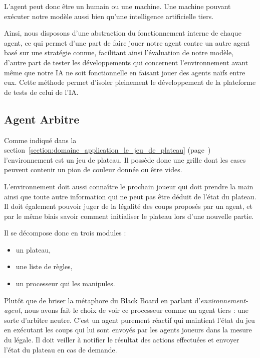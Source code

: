 L'agent peut donc être un humain ou une machine. Une machine pouvant exécuter notre modèle aussi bien qu'une intelligence artificielle tiers. 

Ainsi, nous disposons d'une abstraction du fonctionnement interne de chaque agent, ce qui permet d'une part de faire jouer notre agent contre un autre agent basé sur une stratégie connue, facilitant ainsi l'évaluation de notre modèle, d'autre part de tester les développements qui concernent l'environnement avant même que notre IA ne soit fonctionnelle en faisant jouer des agents naïfs entre eux. Cette méthode permet d'isoler pleinement le développement de la plateforme de tests de celui de l'IA.

\subsection{ Agent \og Arbitre \fg{} }

Comme indiqué dans la section~\ref{section:domaine_application_le_jeu_de_plateau} (page~\pageref{section:domaine_application_le_jeu_de_plateau}) l'environnement est un jeu de plateau. Il possède donc une grille dont les cases peuvent contenir un pion de couleur donnée ou être vides.

L'environnement doit aussi connaître le prochain joueur qui doit prendre la main ainsi que toute autre information qui ne peut pas être déduit de l'état du plateau. Il doit également pouvoir juger de la légalité des coups proposés par un agent, et par le même biais savoir comment initialiser le plateau lors d'une nouvelle partie.

Il se décompose donc en trois modules :
\begin{itemize}
\item un plateau,
\item une liste de règles,
\item un processeur qui les manipules.
\end{itemize}

Plutôt que de briser la métaphore du \og Black Board \fg{} en parlant d'\emph{environnement-agent}, nous avons fait le choix de voir ce processeur comme un agent tiers : une sorte d'arbitre neutre. C'est un agent purement réactif qui maintient l'état du jeu en exécutant les coups qui lui sont envoyés par les agents joueurs dans la mesure du légale. Il doit veiller à notifier le résultat des actions effectuées et envoyer l'état du plateau en cas de demande.

